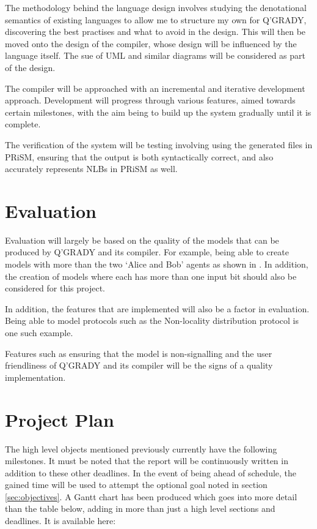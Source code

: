\documentclass[11pt, a4paper]{article}
\begin{document}
The methodology behind the language design involves studying the denotational
semantics of existing languages to allow me to structure my own for Q'GRADY,
discovering the best practises and what to avoid in the design. This will then
be moved onto the design of the compiler, whose design will be influenced by the
language itself. The sue of UML and similar diagrams will be considered as part
of the design.

The compiler will be approached with an incremental and iterative development
approach. Development will progress through various features, aimed towards
certain milestones, with the aim being to build up the system gradually until it
is complete.

The verification of the system will be testing involving using the generated
files in PRiSM, ensuring that the output is both syntactically correct, and also
accurately represents NLBs in PRiSM as well.


\section{Evaluation} %
\label{sec:evaluation}
Evaluation will largely be based on the quality of the models that can be
produced by Q'GRADY and its compiler. For example, being able to create models
with more than the two `Alice and Bob' agents as shown in 
\parencite[Definition~1]{nlb_lamontague}. In addition, the creation of models
where each has more than one input bit should also be considered for this
project.

In addition, the features that are implemented will also be a factor in
evaluation. Being able to model protocols such as the Non-locality distribution
protocol \parencite[Definition~16]{nlb_lamontague} is one such example.

Features such as ensuring that the model is non-signalling and the user
friendliness of Q'GRADY and its compiler will be the signs of a quality
implementation.


\section{Project Plan} %
\label{sec:project_plan}
The high level objects mentioned previously currently have the following
milestones. It must be noted that the report will be continuously written in
addition to these other deadlines. In the event of being ahead of schedule, the
gained time will be used to attempt the optional goal noted in section
\ref{sec:objectives}. A Gantt chart has been produced which goes into more
detail than the table below, adding in more than just a high level sections and
deadlines. It is available here:
\end{document}
